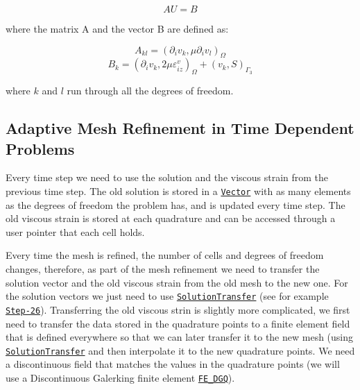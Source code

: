 \[AU=B\]

where the matrix A and the vector B are defined as\-:

\[A_{kl} = (\partial_i v_k, \mu \partial_i v_l)_{\Omega}\] \[B_k = (\partial_i v_k, 2 \mu \varepsilon^v_{iz})_\Omega + (v_k, S)_{\Gamma_3} \]

where $ k $ and $ l $ run through all the degrees of freedom.\hypertarget{index_adaptive_refinement}{}\subsection{Adaptive Mesh Refinement in Time Dependent Problems}\label{index_adaptive_refinement}
Every time step we need to use the solution and the viscous strain from the previous time step. The old solution is stored in a \href{https://www.dealii.org/8.4.0/doxygen/deal.II/classVector.html}{\tt Vector} with as many elements as the degrees of freedom the problem has, and is updated every time step. The old viscous strain is stored at each quadrature and can be accessed through a user pointer that each cell holds.

Every time the mesh is refined, the number of cells and degrees of freedom changes, therefore, as part of the mesh refinement we need to transfer the solution vector and the old viscous strain from the old mesh to the new one. For the solution vectors we just need to use \href{https://www.dealii.org/8.4.0/doxygen/deal.II/classSolutionTransfer.html}{\tt Solution\-Transfer} (see for example \href{https://www.dealii.org/8.2.0/doxygen/deal.II/step_26.html#codeHeatEquationrefine_meshcode}{\tt Step-\/26}). Transferring the old viscous strin is slightly more complicated, we first need to transfer the data stored in the quadrature points to a finite element field that is defined everywhere so that we can later transfer it to the new mesh (using \href{https://www.dealii.org/8.4.0/doxygen/deal.II/classSolutionTransfer.html}{\tt Solution\-Transfer} and then interpolate it to the new quadrature points. We need a discontinuous field that matches the values in the quadrature points (we will use a Discontinuous Galerking finite element \href{https://www.dealii.org/8.2.0/doxygen/deal.II/classFE__DGQ.html}{\tt F\-E\-\_\-\-D\-G\-Q}). 